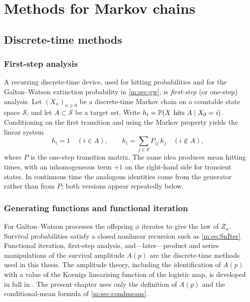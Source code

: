 \section{Methods for Markov chains}
\label{m:sec:methods}

\subsection{Discrete-time methods}
\label{m:sec:dt-methods}

\subsubsection{First-step analysis}
\label{m:sec:firststep}

A recurring discrete-time device, used for hitting probabilities and for the
Galton--Watson extinction probability in \cref{m:sec:gw}, is \emph{first-step}
(or one-step) analysis. Let $(X_n)_{n\ge0}$ be a discrete-time Markov chain on a
countable state space $\mathcal S$, and let $A\subset\mathcal S$ be a target set.
Write $h_i = \mathbb{P}\!\left(X\text{ hits }A\mid X_0=i\right)$. Conditioning on the first transition
and using the Markov property yields the linear system
\begin{equation}
\label{m:eq:firststep}
h_i = 1\quad(i\in A),
\qquad
h_i = \sum_{j\in\mathcal S} P_{ij}\,h_j\quad(i\notin A),
\end{equation}
where $P$ is the one-step transition matrix. The same idea produces mean hitting
times, with an inhomogeneous term $+1$ on the right-hand side for transient states.
In continuous time the analogous identities come from the generator rather than from
$P$; both versions appear repeatedly below.

\subsubsection*{Generating functions and functional iteration}

For Galton--Watson processes the offspring \pgf{} $\phi$ iterates to give the law of
$Z_n$. Survival probabilities satisfy a closed nonlinear recursion such as
\cref{m:eq:SnIter}. Functional iteration, first-step analysis, and---later---product
and series manipulations of the survival amplitude $A(p)$ are the discrete-time
methods used in this thesis. The amplitude theory, including the identification of
$A(p)$ with a value of the Koenigs linearising function of the logistic map, is
developed in full in \ChA. The present chapter uses only the definition of $A(p)$ and
the conditional-mean formula of \cref{m:sec:condmeans}.

